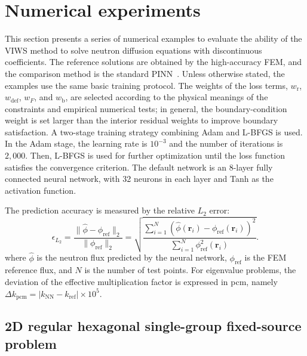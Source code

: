 \documentclass[final,3p,times,sort&compress]{elsarticle}
\begin{document}
\section{Numerical experiments}
\label{sec:numerical_experiments}

This section presents a series of numerical examples to evaluate the ability of the VIWS method to solve neutron diffusion equations with discontinuous coefficients. The reference solutions are obtained by the high-accuracy FEM, and the comparison method is the standard PINN~\cite{raissi2019physicsinformed}.
Unless otherwise stated, the examples use the same basic training protocol. The weights of the loss terms, $w_{\mathrm r}$, $w_{\mathrm{def}}$, $w_F$, and $w_{\mathrm b}$, are selected according to the physical meanings of the constraints and empirical numerical tests; in general, the boundary-condition weight is set larger than the interior residual weights to improve boundary satisfaction. A two-stage training strategy combining Adam and L-BFGS is used. In the Adam stage, the learning rate is $10^{-3}$ and the number of iterations is $2,000$. Then, L-BFGS is used for further optimization until the loss function satisfies the convergence criterion. The default network is an 8-layer fully connected neural network, with 32 neurons in each layer and Tanh as the activation function.

The prediction accuracy is measured by the relative $L_2$ error:
\begin{equation}
\label{eq:l2_error}
\epsilon_{L_2}
=
\frac{\|\hat{\phi}-\phi_{\mathrm{ref}}\|_2}
{\|\phi_{\mathrm{ref}}\|_2}
=
\sqrt{
\frac{
\sum_{i=1}^{N}
\left(
\hat{\phi}(\boldsymbol r_i)-\phi_{\mathrm{ref}}(\boldsymbol r_i)
\right)^2
}{
\sum_{i=1}^{N}
\phi_{\mathrm{ref}}^2(\boldsymbol r_i)
}
}.
\end{equation}
where $\hat{\phi}$ is the neutron flux predicted by the neural network, $\phi_{\mathrm{ref}}$ is the FEM reference flux, and $N$ is the number of test points. For eigenvalue problems, the deviation of the effective multiplication factor is expressed in pcm, namely
$\Delta k_{\mathrm{pcm}}=|k_{\mathrm{NN}}-k_{\mathrm{ref}}|\times 10^5$.

\subsection{2D regular hexagonal single-group fixed-source problem}
\label{subsec:case1}
\end{document}
